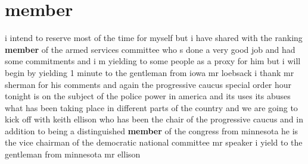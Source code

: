 \documentclass{article}
\begin{document}
\section*{member}
i intend to reserve most of the time for myself but i have shared with the ranking {\bf \color{red} member} of the armed services committee who s done a very good job and had some commitments and i m yielding to some people as a proxy for him but i will begin by yielding 1 minute to the gentleman from iowa mr loebsack
\vspace{8mm}
i thank mr sherman for his comments and again the progressive caucus special order hour tonight is on the subject of the police power in america and its uses its abuses what has been taking place in different parts of the country and we are going to kick off with keith ellison who has been the chair of the progressive caucus and in addition to being a distinguished {\bf \color{red} member} of the congress from minnesota he is the vice chairman of the democratic national committee mr speaker i yield to the gentleman from minnesota mr ellison
\vspace{8mm}
\end{document}

